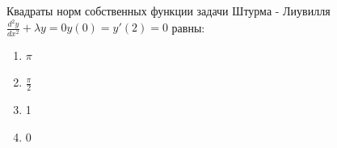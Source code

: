 Квадраты норм собственных функции задачи Штурма - Лиувилля \(\frac{d^2y}{dx^2}+\lambda y=0 y\left(0\right)=y'\left(2\right)=0\) равны:

\begin{enumerate}[label=\arabic*)]
    \item \(\pi\)
    \item \(\frac{\pi }{2}\)
    \item 1
    \item 0
\end{enumerate}

